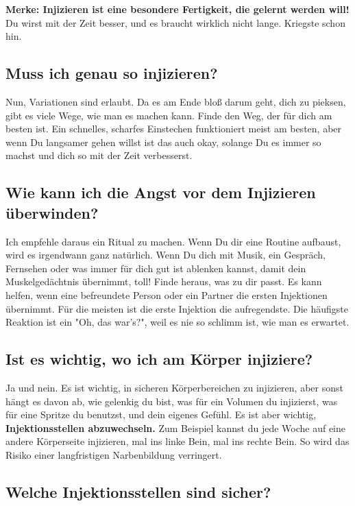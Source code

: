 \documentclass{article}
\begin{document}
{\textbf{Merke: Injizieren ist eine besondere Fertigkeit, die gelernt werden will!} Du wirst mit der Zeit besser, und es braucht wirklich nicht lange. Kriegste schon hin.

\subsection{Muss ich genau so injizieren?}

Nun, Variationen sind erlaubt. Da es am Ende bloß darum geht, dich zu pieksen, gibt es viele Wege, wie man es machen kann. Finde den Weg, der für dich am besten ist. Ein schnelles, scharfes Einstechen funktioniert meist am besten, aber wenn Du langsamer gehen willst ist das auch okay, solange Du es immer so machst und dich so mit der Zeit verbesserst.

\subsection{Wie kann ich die Angst vor dem Injizieren überwinden?}

Ich empfehle daraus ein Ritual zu machen. Wenn Du dir eine Routine aufbaust, wird es irgendwann ganz natürlich. Wenn Du dich mit Musik, ein Gespräch, Fernsehen oder was immer für dich gut ist ablenken kannst, damit dein Muskelgedächtnis übernimmt, toll! Finde heraus, was zu dir passt. Es kann helfen, wenn eine befreundete Person oder ein Partner die ersten Injektionen übernimmt. Für die meisten ist die erste Injektion die aufregendste. Die häufigste Reaktion ist ein "Oh, das war's?", weil es nie so schlimm ist, wie man es erwartet.

\subsection{Ist es wichtig, wo ich am Körper injiziere?}

Ja und nein. Es ist wichtig, in sicheren Körperbereichen zu injizieren, aber sonst hängt es davon ab, wie gelenkig du bist, was für ein Volumen du injizierst, was für eine Spritze du benutzst, und dein eigenes Gefühl. Es ist aber wichtig, \textbf{Injektionsstellen abzuwechseln.} Zum Beispiel kannst du jede Woche auf eine andere Körperseite injizieren, mal ins linke Bein, mal ins rechte Bein. So wird das Risiko einer langfristigen Narbenbildung verringert.

\subsection{Welche Injektionsstellen sind sicher?}

}
\end{document}
